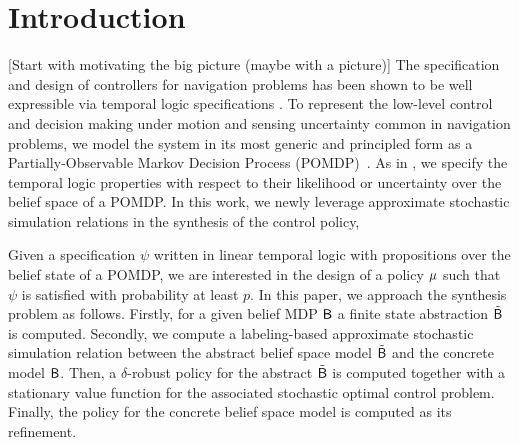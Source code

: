 \documentclass{ifacconf}
\newcommand{\red}[1]{{\color{red} #1}}
\renewcommand{\axx}[1]{{\color{orange} Ali: #1}}
\begin{document}
\section{Introduction }\label{subsec:intro}
\red{[Start with motivating the big picture (maybe with a picture)]}
The specification and design of controllers for navigation problems has  been shown to be well expressible via temporal logic specifications \citep{Murray2009}.      To represent the low-level control and decision making under motion and sensing uncertainty common in navigation problems, we model the system
    in its most generic and principled form as a Partially-Observable Markov Decision Process
    (POMDP)~\citep{Kaelbling98,Smallwood73}.
As in \citep{JonesDTL2013}, we specify the temporal logic properties with respect to their likelihood or uncertainty over the belief space of a POMDP.
In this work, we newly  leverage approximate stochastic simulation relations in the synthesis of  the control policy,  
 
 


Given a specification $\psi$  written in linear temporal logic with propositions over the belief state of a POMDP, we are interested 
in the design of a policy ${\mu}$ such that  $\psi$ is satisfied with probability at least $p$.
%
In this paper, we approach the synthesis problem as follows. 
Firstly,  for a given belief MDP $\mathsf{B}$ a finite state abstraction  $\tilde {\mathsf{B}}$ is computed.
Secondly,  we compute a labeling-based approximate stochastic  simulation relation between the abstract belief space model  $\tilde{\mathsf{B}}$ and the concrete model $\mathsf{B}$.
 Then,  a $\delta$-robust policy for the abstract $\tilde{\mathsf{B}}$ is computed  together with a stationary value function for the associated stochastic optimal control problem.
  Finally, the policy for the concrete belief space model is computed  as its refinement.
\end{document}
